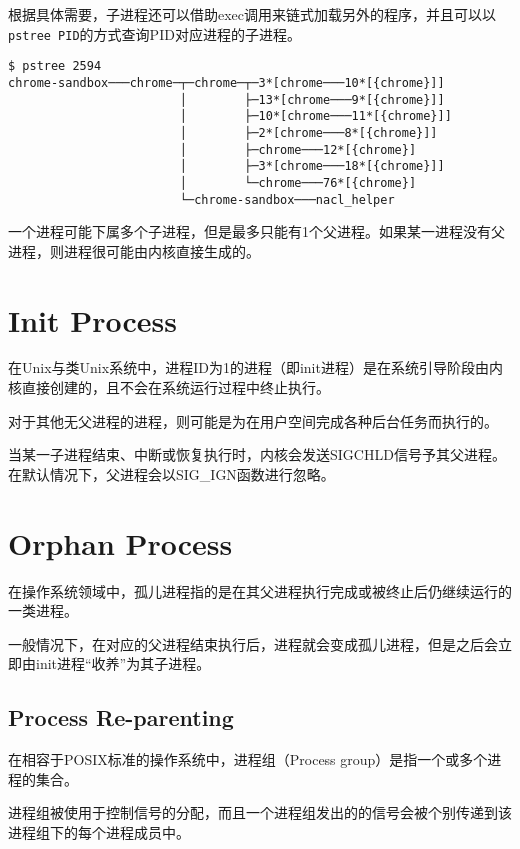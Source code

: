 根据具体需要，子进程还可以借助exec调用来链式加载另外的程序，并且可以以\texttt{pstree PID}的方式查询PID对应进程的子进程。

\begin{verbatim}
$ pstree 2594
chrome-sandbox───chrome─┬─chrome─┬─3*[chrome───10*[{chrome}]]
                        │        ├─13*[chrome───9*[{chrome}]]
                        │        ├─10*[chrome───11*[{chrome}]]
                        │        ├─2*[chrome───8*[{chrome}]]
                        │        ├─chrome───12*[{chrome}]
                        │        ├─3*[chrome───18*[{chrome}]]
                        │        └─chrome───76*[{chrome}]
                        └─chrome-sandbox───nacl_helper
\end{verbatim}


一个进程可能下属多个子进程，但是最多只能有1个父进程。如果某一进程没有父进程，则进程很可能由内核直接生成的。



\section{Init Process}


在Unix与类Unix系统中，进程ID为1的进程（即init进程）是在系统引导阶段由内核直接创建的，且不会在系统运行过程中终止执行。

对于其他无父进程的进程，则可能是为在用户空间完成各种后台任务而执行的。


当某一子进程结束、中断或恢复执行时，内核会发送SIGCHLD信号予其父进程。在默认情况下，父进程会以SIG\_IGN函数进行忽略。

\section{Orphan Process}

在操作系统领域中，孤儿进程指的是在其父进程执行完成或被终止后仍继续运行的一类进程。

一般情况下，在对应的父进程结束执行后，进程就会变成孤儿进程，但是之后会立即由init进程“收养”为其子进程。


\subsection{Process Re-parenting}

在相容于POSIX标准的操作系统中，进程组（Process group）是指一个或多个进程的集合。

进程组被使用于控制信号的分配，而且一个进程组发出的的信号会被个别传递到该进程组下的每个进程成员中。

